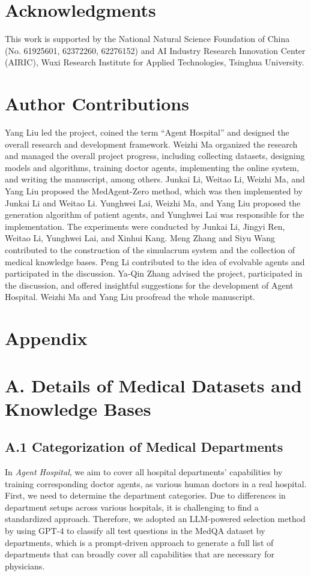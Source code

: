 \documentclass[fleqn,12pt]{wlscirep}
\begin{document}
\section*{Acknowledgments} This work is supported by the National Natural Science Foundation of China (No. 61925601, 62372260, 62276152) and AI Industry Research Innovation Center (AIRIC), Wuxi Research Institute for Applied Technologies, Tsinghua University. 

\section*{Author Contributions} 
Yang Liu led the project, coined the term ``Agent Hospital'' and designed the overall research and development framework. Weizhi Ma organized the research and managed the overall project progress, including collecting datasets, designing models and algorithms, training doctor agents, implementing the online system, and writing the manuscript, among others. Junkai Li, Weitao Li, Weizhi Ma, and Yang Liu proposed the MedAgent-Zero method, which was then implemented by Junkai Li and Weitao Li. Yunghwei Lai, Weizhi Ma, and Yang Liu proposed the generation algorithm of patient agents, and Yunghwei Lai was responsible for the implementation. The experiments were conducted by Junkai Li, Jingyi Ren, Weitao Li, Yunghwei Lai, and Xinhui Kang. Meng Zhang and Siyu Wang contributed to the construction of the simulacrum system and the collection of medical knowledge bases. Peng Li contributed to the idea of evolvable agents and participated in the discussion. Ya-Qin Zhang advised the project, participated in the discussion, and offered insightful suggestions for the development of Agent Hospital. Weizhi Ma and Yang Liu proofread the whole manuscript.


\renewcommand\refnamemethods{} 

\newpage
\section*{Appendix}

\section*{A. Details of Medical Datasets and Knowledge Bases}

\subsection*{A.1 Categorization of Medical Departments}
In \textit{Agent Hospital}, we aim to cover all hospital departments' capabilities by training corresponding doctor agents, as various human doctors in a real hospital. First, we need to determine the department categories. Due to differences in department setups across various hospitals, it is challenging to find a standardized approach. Therefore, we adopted an LLM-powered selection method by using GPT-4 to classify all test questions in the MedQA dataset by departments, which is a prompt-driven approach to generate a full list of departments that can broadly cover all capabilities that are necessary for physicians.
\end{document}
